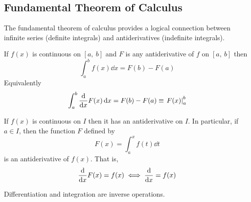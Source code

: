 \documentclass{article}
\begin{document}
\subsection{Fundamental Theorem of Calculus}
The fundamental theorem of calculus provides a logical connection between infinite series (definite integrals) and antiderivatives (indefinite integrals).
\begin{theorem}
    If $f(x)$ is continuous on $\left[ a,\:b \right]$ and $F$ is any antiderivative of $f$ on $\left[ a,\:b \right]$ then
    \begin{equation*}
        \int_a^b f(x)\dd{x} = F(b) - F(a)
    \end{equation*}
    Equivalently
    \begin{equation*}
        \int_a^b \dv{x}F(x) \dd{x} = F(b) - F(a) \equiv \left.F(x)\right|_a^b
    \end{equation*}
\end{theorem}
\begin{theorem}
    If $f(x)$ is continuous on $I$ then it has an antiderivative on $I$. In particular, if $a\in I$, then the function $F$ defined by
    \begin{equation*}
        F(x) = \int_a^x f(t)\dd{t}
    \end{equation*}
    is an antiderivative of $f(x)$. That is,
    \begin{equation*}
        \dv{x}F(x) = f(x) \iff \dv{}{x}(\int_a^x f(t) \dd{t}) = f(x)
    \end{equation*}
\end{theorem}
\begin{theorem}
    Differentiation and integration are inverse operations.
\end{theorem}
\newpage
\end{document}

